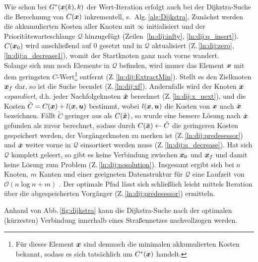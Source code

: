 Wie schon bei $G^\ast(\boldsymbol{x}(k), k)$ der Wert-Iteration erfolgt auch bei der Dijkstra-Suche die Berechnung von $C(\boldsymbol{x})$ inkrementell, s.\ Alg.\,\ref{alg:Dijkstra}. %
Zunächst werden die akkumulierten Kosten aller Knoten mit $\infty$ initialisiert und der Prioritätswarteschlange $\mathcal Q$ hinzugefügt (Zeilen~\ref{ln:dij:infty}, \ref{ln:dij:q_insert}). $C(\boldsymbol{x}_0)$ wird anschließend auf $0$ gesetzt und in $\mathcal Q$ aktualisiert (Z.\,\ref{ln:dij:zero}, \ref{ln:dij:q_decrease1}), womit der Startknoten ganz nach vorne wandert. \\
Solange sich nun noch Elemente in $\mathcal Q$ befinden, wird immer das Element $\boldsymbol{x}$ mit dem geringsten $C$-Wert\footnote{Für dieses Element $\boldsymbol{x}$ sind demnach die minimalen akkumulierten Kosten bekannt, sodass es sich tatsächlich um $C^\ast(\boldsymbol{x})$ handelt.} entfernt (Z.\,\ref{ln:dij:ExtractMin}). Stellt es den Zielknoten $\boldsymbol{x}_f$ dar, so ist die Suche beendet (Z.\,\ref{ln:dij:xf}). Andernfalls wird der Knoten $\boldsymbol{x}$ \emph{expandiert}, d.h. jeder Nachfolgeknoten $\tilde{\boldsymbol{x}}$ berechnet (Z.\,\ref{ln:dij:x_next}), und die Kosten $\tilde C = C(\boldsymbol{x}) + l(\boldsymbol{x}, \boldsymbol{u})$ bestimmt, wobei $l(\boldsymbol{x}, \boldsymbol{u})$ die Kosten von $\boldsymbol{x}$ nach $\tilde{\boldsymbol{x}}$ bezeichnen. Fällt $\tilde C$ geringer aus als $C(\tilde{\boldsymbol{x}})$, so wurde eine bessere Lösung nach $\tilde{\boldsymbol{x}}$ gefunden als zuvor berechnet, sodass durch $C(\tilde{\boldsymbol{x}})\leftarrow \tilde C$ die geringeren Kosten gespeichert werden, der Vorgängerknoten zu merken ist
 (Z.\,\ref{ln:dij:predesessor}) und $\tilde{\boldsymbol{x}}$ weiter vorne in $\mathcal Q$ einsortiert werden muss  (Z.\,\ref{ln:dij:q_decrease}). Hat sich $\mathcal Q$ komplett geleert, so gibt es keine Verbindung zwischen $\boldsymbol{x}_0$ und $\boldsymbol{x}_f$ und damit keine Lösung zum Problem (Z.\,\ref{ln:dij:nosolution}). Insgesamt ergibt sich bei $n$ Knoten, $m$ Kanten und einer geeigneten Datenstruktur für $\mathcal Q$ eine Laufzeit von $\mathcal O(n \log n + m)$ \cite{lavalle2006pa}. 
Der optimale Pfad lässt sich schließlich leicht mittels Iteration über die abgespeicherten Vorgänger (Z.\,\ref{ln:dij:predesessor}) ermitteln.

Anhand von Abb.\,\ref{fig:dijkstra} kann die Dijkstra-Suche nach der optimalen (kürzesten) Verbindung innerhalb eines Straßennetzes nachvollzogen werden.



